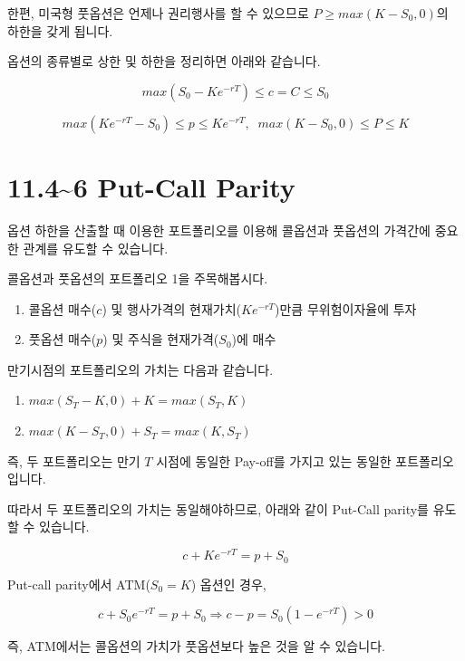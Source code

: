 \documentclass[
  letterpaper,
  DIV=11,
  numbers=noendperiod]{scrreprt}
\providecommand{\tightlist}{%
  \setlength{\itemsep}{0pt}\setlength{\parskip}{0pt}}\usepackage{longtable,booktabs,array}
\begin{document}
한편, 미국형 풋옵션은 언제나 권리행사를 할 수 있으므로
\(P\geq max(K-S_0,0)\)의 하한을 갖게 됩니다.

옵션의 종류별로 상한 및 하한을 정리하면 아래와 같습니다.

\[max(S_0-Ke^{-rT})\leq c=C\leq S_0\]

\[max(Ke^{-rT}-S_0)\leq p\leq Ke^{-rT},\;\;max(K-S_0,0)\leq P \leq K\]

\section*{11.4\textasciitilde6 Put-Call Parity}\label{put-call-parity}


옵션 하한을 산출할 때 이용한 포트폴리오를 이용해 콜옵션과 풋옵션의
가격간에 중요한 관계를 유도할 수 있습니다.

콜옵션과 풋옵션의 포트폴리오 1을 주목해봅시다.

\begin{enumerate}
\def\labelenumi{\arabic{enumi}.}
\tightlist
\item
  콜옵션 매수(\(c\)) 및 행사가격의 현재가치(\(Ke^{-rT}\))만큼
  무위험이자율에 투자
\item
  풋옵션 매수(\(p\)) 및 주식을 현재가격(\(S_0\))에 매수
\end{enumerate}

만기시점의 포트폴리오의 가치는 다음과 같습니다.

\begin{enumerate}
\def\labelenumi{\arabic{enumi}.}
\tightlist
\item
  \(max(S_T-K,0)+K=max(S_T,K)\)
\item
  \(max(K-S_T,0)+S_T=max(K,S_T)\)
\end{enumerate}

즉, 두 포트폴리오는 만기 \(T\) 시점에 동일한 Pay-off를 가지고 있는
동일한 포트폴리오입니다.

따라서 두 포트폴리오의 가치는 동일해야하므로, 아래와 같이 Put-Call
parity를 유도할 수 있습니다.

\[c+Ke^{-rT}=p+S_0\]

\begin{tcolorbox}[enhanced jigsaw, toprule=.15mm, breakable, left=2mm, leftrule=.75mm, opacitybacktitle=0.6, coltitle=black, rightrule=.15mm, colback=white, titlerule=0mm, bottomtitle=1mm, colframe=quarto-callout-tip-color-frame, title=\textcolor{quarto-callout-tip-color}{\faLightbulb}\hspace{0.5em}{ATM 옵션의 가격}, toptitle=1mm, arc=.35mm, colbacktitle=quarto-callout-tip-color!10!white, opacityback=0, bottomrule=.15mm]

Put-call parity에서 ATM(\(S_0=K\)) 옵션인 경우,

\[c+S_0e^{-rT}=p+S_0\Rightarrow c-p=S_0(1-e^{-rT})>0\]

즉, ATM에서는 콜옵션의 가치가 풋옵션보다 높은 것을 알 수 있습니다.

\end{tcolorbox}
\end{document}
